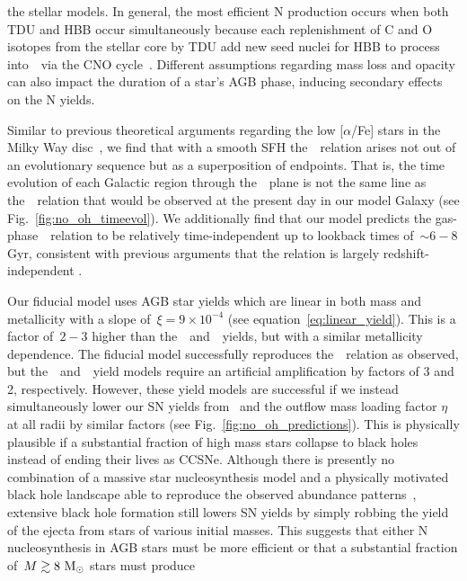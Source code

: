 \documentclass[ms.tex]{subfiles}
\begin{document}
the stellar models.
In general, the most efficient N production occurs when both TDU and HBB
occur simultaneously because each replenishment of C and O isotopes from the
stellar core by TDU add new seed nuclei for HBB to process into~\Nfourteen~via
the CNO cycle~\citep{Ventura2013}.
Different assumptions regarding mass loss and opacity can also impact the
duration of a star's AGB phase, inducing secondary effects on the N yields.
\par
Similar to previous theoretical arguments regarding the low [$\alpha$/Fe] stars
in the Milky Way disc~\citep[e.g.][]{Schoenrich2009, Nidever2014, Buck2020,
Sharma2021, Johnson2021}, we find that with a smooth SFH the~\ohno~relation
arises not out of an evolutionary sequence but as a superposition of endpoints.
That is, the time evolution of each Galactic region through the~\ohno~plane
is not the same line as the~\ohno~relation that would be observed at the
present day in our model Galaxy (see Fig.~\ref{fig:no_oh_timeevol}).
We additionally find that our model predicts the gas-phase~\ohno~relation to be
relatively time-independent up to lookback times of~$\sim6 - 8$ Gyr, consistent
with previous arguments that the relation is largely redshift-independent
\citep{Vincenzo2018, HaydenPawson2021}.
\par
Our fiducial model uses AGB star yields which are linear in both mass and
metallicity with a slope of~$\xi = 9\times10^{-4}$ (see
equation~\ref{eq:linear_yield}).
This is a factor of~$2 - 3$ higher than the~\cristallo~and~\ventura~yields, but
with a similar metallicity dependence.
The fiducial model successfully reproduces the~\ohno~relation as observed, but
the~\cristallo~and~\ventura~yield models require an artificial amplification by
factors of 3 and 2, respectively.
However, these yield models are successful if we instead simultaneously lower
our SN yields from~\citet{Johnson2021} and the outflow mass loading factor
$\eta$ at all radii by similar factors (see Fig.~\ref{fig:no_oh_predictions}).
This is physically plausible if a substantial fraction of high mass stars
collapse to black holes instead of ending their lives as CCSNe.
Although there is presently no combination of a massive star nucleosynthesis
model and a physically motivated black hole landscape able to reproduce the
observed abundance patterns~\citep{Griffith2021a}, extensive black hole
formation still lowers SN yields by simply robbing the yield of the ejecta
from stars of various initial masses.
This suggests that either N nucleosynthesis in AGB stars must be more efficient 
or that a substantial fraction of~$M \gtrsim 8~\text{M}_\odot$ stars must produce
\end{document}
